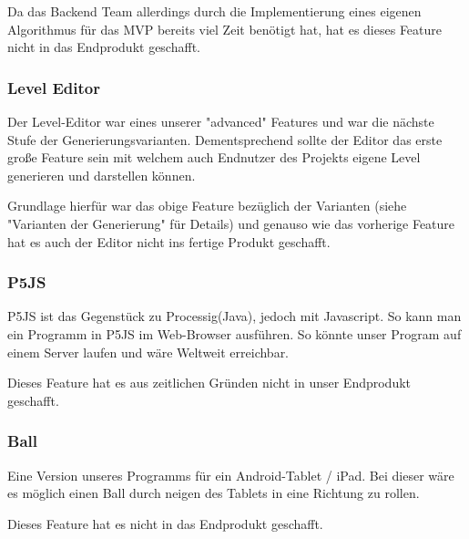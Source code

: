         Da das Backend Team allerdings durch die Implementierung eines eigenen Algorithmus für das MVP bereits viel Zeit benötigt hat, hat es dieses Feature nicht in das Endprodukt geschafft. 


    \subsubsection*{Level Editor}
        Der Level-Editor war eines unserer "advanced" Features und war die nächste Stufe der Generierungsvarianten. Dementsprechend sollte der Editor das erste große Feature sein mit welchem auch Endnutzer des Projekts eigene Level generieren und darstellen können. 
        
        Grundlage hierfür war das obige Feature bezüglich der Varianten (siehe "Varianten der Generierung" für Details) und genauso wie das vorherige Feature hat es auch der Editor nicht ins fertige Produkt geschafft. 


    \subsubsection*{P5JS}
		P5JS ist das Gegenstück zu Processig(Java), jedoch mit Javascript. So kann man ein Programm in P5JS im Web-Browser ausführen. So könnte unser Program auf einem Server laufen  und wäre Weltweit erreichbar. 
		
		Dieses Feature hat es aus zeitlichen Gründen nicht in unser Endprodukt geschafft.
		 

    \subsubsection*{Ball}
    	Eine Version unseres Programms für ein Android-Tablet / iPad. Bei dieser wäre es möglich einen Ball durch neigen des Tablets in eine Richtung zu rollen.
    	
    	Dieses Feature hat es nicht in das Endprodukt geschafft. 

		
 
		
  
